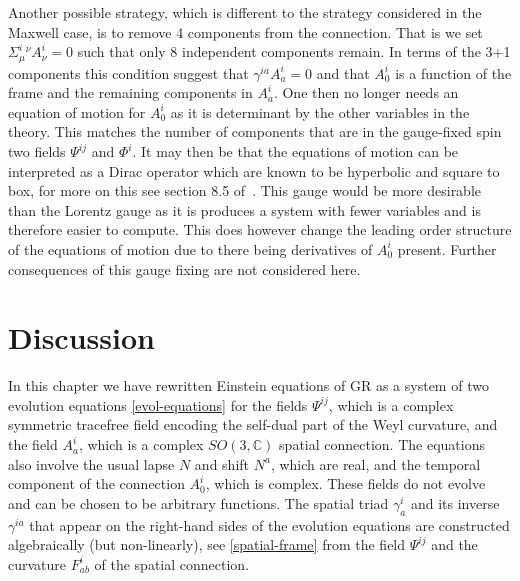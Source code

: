 \documentclass[10pt]{report}
\theoremstyle{definition}
\newcommand{\C}[0]{\mathbb{C}}
\begin{document}
Another possible strategy, which is different to the strategy considered in the Maxwell case, is to remove 4 components from the connection. That is we set $\Sigma^i_\mu{}^\nu A^i_\nu = 0$ such that only 8 independent components remain. In terms of the 3+1 components this condition suggest that $\gamma^{ia} A^i_a = 0$ and that $A^i_0$ is a function of the frame and the remaining components in $A^i_a$. One then no longer needs an equation of motion for $A^i_0$ as it is determinant by the other variables in the theory. This matches the number of components that are in the gauge-fixed spin two fields $\Psi^{ij}$ and $\Phi^i$. It may then be that the equations of motion can be interpreted as a Dirac operator which are known to be hyperbolic and square to box, for more on this see section 8.5 of~\cite{FormGenRelGravity2020}. This gauge would be more desirable than the Lorentz gauge as it is produces a system with fewer variables and is therefore easier to compute. This does however change the leading order structure of the equations of motion due to there being derivatives of $A^i_0$ present. Further consequences of this gauge fixing are not considered here.

\section{Discussion}

In this chapter we have rewritten Einstein equations of GR as a system of two evolution equations \cref{evol-equations} for the fields $\Psi^{ij}$, which is a complex symmetric tracefree field encoding the self-dual part of the Weyl curvature, and the field $A_a^i$, which is a complex $SO(3,\C)$ spatial connection. The equations also involve the usual lapse $N$ and shift $N^a$, which are real, and the temporal component of the connection $A_0^i$, which is complex. These fields do not evolve and can be chosen to be arbitrary functions. The spatial triad $\gamma^i_a$ and its inverse $\gamma^{ia}$ that appear on the right-hand sides of the evolution equations are constructed algebraically (but non-linearly), see \cref{spatial-frame} from the field $\Psi^{ij}$ and the curvature $F^i_{ab}$ of the spatial connection. 
\end{document}
